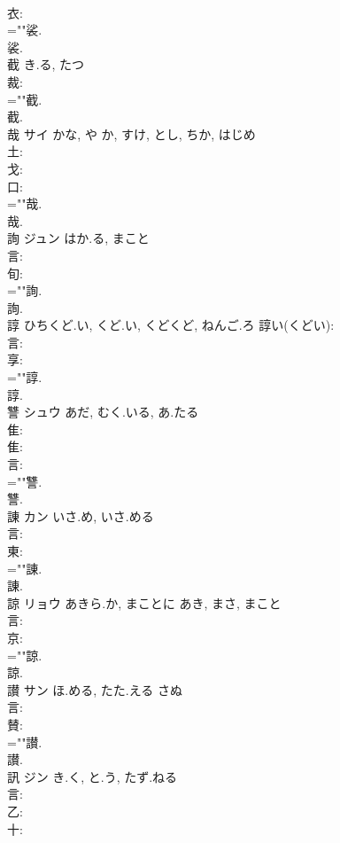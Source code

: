 \documentclass[8pt]{extreport}
\begin{document}
\begin{CJK}{UTF8}{min}
\\	衣: 
\\	=""裟.
\\	裟.
\\	截		き.る, たつ				
\\	裁: 
\\	=""截.
\\	截.
\\	哉	サイ	かな, や	か, すけ, とし, ちか, はじめ	
\\	土: 
\\	戈: 
\\	口: 
\\	=""哉.
\\	哉.
\\	詢	ジュン	はか.る, まこと		
\\	言: 
\\	旬: 
\\	=""詢.
\\	詢.
\\	諄		ひちくど.い, くど.い, くどくど, ねんご.ろ			諄い(くどい): 
\\	言: 
\\	享: 
\\	=""諄.
\\	諄.
\\	讐	シュウ	あだ, むく.いる, あ.たる		
\\	隹: 
\\	隹: 
\\	言: 
\\	=""讐.
\\	讐.
\\	諌	カン	いさ.め, いさ.める		
\\	言: 
\\	東: 
\\	=""諌.
\\	諌.
\\	諒	リョウ	あきら.か, まことに	あき, まさ, まこと	
\\	言: 
\\	京: 
\\	=""諒.
\\	諒.
\\	讃	サン	ほ.める, たた.える	さぬ	
\\	言: 
\\	賛: 
\\	=""讃.
\\	讃.
\\	訊	ジン	き.く, と.う, たず.ねる		
\\	言: 
\\	乙: 
\\	十: 

\end{CJK}
\end{document}

